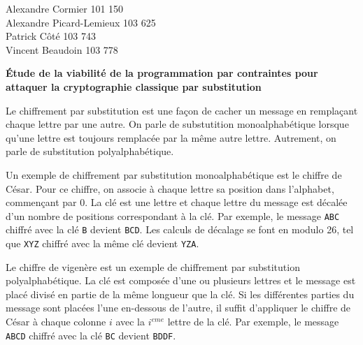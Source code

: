\documentclass[12pt]{article}
\begin{document}
    \thispagestyle{empty}


    \begin{flushright}
        \parbox{0.5\textwidth}{
            Alexandre Cormier 101 150\\
            Alexandre Picard-Lemieux 103 625\\
            Patrick Côté 103 743\\
            Vincent Beaudoin 103 778
        }
    \end{flushright}

    \bigskip
    \bigskip

    \begin{center}
        \parbox{0.6\textwidth}{
            \begin{center}
                \textbf{Étude de la viabilité de la programmation par contraintes pour attaquer la cryptographie classique par substitution}
            \end{center}
        }
    \end{center}

    \bigskip
    \bigskip

    Le chiffrement par substitution est une façon de cacher un message en remplaçant chaque lettre par une autre.
    On parle de substutition monoalphabétique lorsque qu'une lettre est toujours remplacée par la même autre lettre. Autrement, on parle de substitution polyalphabétique.

    Un exemple de chiffrement par substitution monoalphabétique est le chiffre de César. Pour ce chiffre, on associe à chaque lettre sa position dans l'alphabet, commençant par 0.
    La clé est une lettre et chaque lettre du message est décalée d'un nombre de positions correspondant à la clé. Par exemple, le message \texttt{ABC} chiffré avec la clé \texttt{B} devient \texttt{BCD}.
    Les calculs de décalage se font en modulo 26, tel que \texttt{XYZ} chiffré avec la même clé devient \texttt{YZA}.

    Le chiffre de vigenère est un exemple de chiffrement par substitution polyalphabétique. La clé est composée d'une ou plusieurs lettres et le message est placé divisé en partie de la même longueur que la clé.
    Si les différentes parties du message sont placées l'une en-dessous de l'autre, il suffit d'appliquer le chiffre de César à chaque colonne $i$ avec la $i^{eme}$ lettre de la clé.
    Par exemple, le message \texttt{ABCD} chiffré avec la clé \texttt{BC} devient \texttt{BDDF}.
\end{document}
